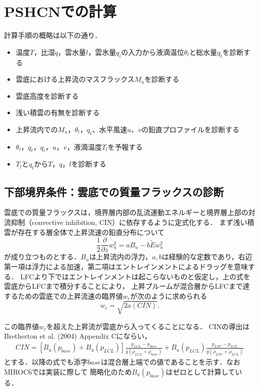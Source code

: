 \documentclass[platex, dvipdfmx]{jsarticle}
\begin{document}
\section{PSHCNでの計算}
計算手順の概略は以下の通り．

\begin{itemize}
    \item 温度$T$，比湿$q$，雲水量$l$，雲氷量$q_i$の入力から液滴温位$\theta_l$と総水量$q_t$を診断する
    \item 雲底における上昇流のマスフラックス$M_u$を診断する
    \item 雲底高度を診断する
    \item 浅い積雲の有無を診断する
    \item 上昇流内での$M_u$，$\theta_l$，$q_t$、水平風速$u$、$v$の鉛直プロファイルを診断する
    \item $\theta_l$，$q_t$，$q_i$，$u$，$v$，液滴温度$T_l$を予報する
    \item $T_l$と$q_t$から$T$，$q$，$l$を診断する
\end{itemize}


\subsection{下部境界条件：雲底での質量フラックスの診断}
雲底での質量フラックスは，境界層内部の乱流運動エネルギーと境界層上部の対流抑制（convective inhibition, CIN）に依存するように定式化する．
まず浅い積雲が存在する層全体で上昇流速の鉛直分布について
\begin{equation}
    \frac{1}{2}\frac{\partial}{\partial z}w_u^2=aB_u-b\tilde{E} w_u^2
\end{equation}
が成り立つものとする．$B_u$は上昇流内の浮力，$a,b$は経験的な定数であり，右辺第一項は浮力による加速，第二項はエントレインメントによるドラッグを意味する．
LFCより下ではエントレインメントは起こらないものと仮定し，上の式を雲底からLFCまで積分することにより，
上昇プルームが混合層からLFCまで達するための雲底での上昇流速の臨界値$w_c$が次のように求められる
\begin{equation}
    w_c = \sqrt{2a(CIN)}.
\end{equation}

この臨界値$w_c$を超えた上昇流が雲底から入ってくることになる．
CINの導出はBretherton et al. (2004) Appendix Cにならい，
\begin{align}
    CIN = [B_u(p_{base}) + B_u(p_{LCL})]\frac{p_{LCL}-p_{base}}{g(\rho_{LCL}+\rho_{base})} + B_u(p_{LCL})\frac{p_{LFC}-p_{LCL}}{g(\rho_{LFC}+\rho_{LCL})}
\end{align}
とする．以降の式でも添字$\mathit{base}$は混合層上端での値であることを示す．なおMIROC6では実装に際して
簡略化のため$B_u(p_{base})$はゼロとして計算している．
\end{document}
